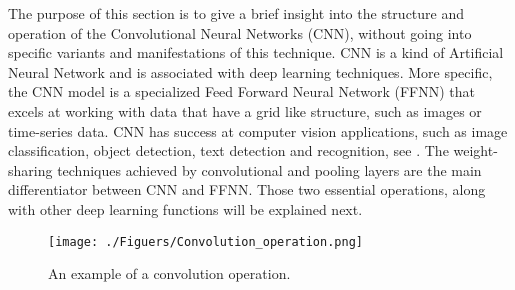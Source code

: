 \documentclass[final,3p,times]{elsarticle}
\begin{document}
The purpose of this section is to give a brief insight into the structure and operation of the Convolutional Neural Networks (CNN), without going into specific variants and manifestations of this technique. CNN is a kind of Artificial Neural Network and is associated with deep learning techniques. More specific, the CNN model is a specialized Feed Forward Neural Network (FFNN) that excels at working with data that have a grid like structure, such as images or time-series data. CNN has success at computer vision applications, such as image classification, object detection, text detection and recognition, see \citet{gu2018recent}. The weight-sharing techniques achieved by convolutional and pooling layers are the main differentiator between CNN and FFNN. Those two essential operations, along with other deep learning functions will be explained next.

\begin{figure}[b]
	\centering 
	\texttt{[image: ./Figuers/Convolution\_operation.png]} 
	\caption{An example of a convolution operation.}
	\label{convolution_operation}
\end{figure}
\end{document}
